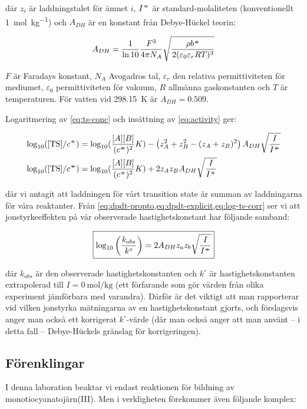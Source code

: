 där $z_i$ är laddningstalet för ämnet $i$, $I^{-\kern-5pt{\circ}\kern-5pt-}$ är
standard-molaliteten (konventionellt \SI{1}{\mole\per\kg}) och $A_{DH}$
är en konstant från Debye-Hückel teorin: 

\begin{equation}
  \label{eq:debye-huckel-a}
  A_{DH} = \frac{1}{\ln 10} \frac{F^3}{4\pi N_A}\sqrt{\frac{\rho b^{-\kern-5pt{\circ}\kern-5pt-}}{2(\varepsilon_0\varepsilon_rRT)^3}}
\end{equation}

$F$ är Faradays konstant, $N_A$ Avogadros tal, $\varepsilon_r$ den
relativa permittiviteten för mediumet, $\varepsilon_0$ permittiviteten för
vakuum, $R$ allmänna gaskonstanten och $T$ är temperaturen. För vatten vid
\SI{298.15}{\kelvin} är $A_{DH} = 0.509$.

Logaritmering av \cref{eq:ts-conc} och insättning av \cref{eq:activity}
ger:

\begin{align}
  \log_{10}([\ce{TS}] / c^\plimsoll) &= \log_{10}(\frac{[A][B]}{(c^\plimsoll)^2}K) - \left(z_A^2 + z_B^2 - (z_A+z_B)^2\right) A_{DH}
                  \sqrt{\frac{I}{I^\plimsoll}} \\
  \label{eq:log-ts-corr}
  \log_{10}([\ce{TS}] / c^\plimsoll) &= \log_{10}(\frac{[A][B]}{(c^\plimsoll)^2}K) + 2z_Az_BA_{DH}\sqrt{\frac{I}{I^\plimsoll}}
\end{align}

där vi antagit att laddningen för vårt transition state är summan av
laddningarna för våra reaktanter.
Från \cref{eq:dpdt-propto,eq:dpdt-explicit,eq:log-ts-corr} ser vi att jonstyrkeeffekten
på vår observerade hastighetskonstant har följande samband:

\begin{align}
  \label{eq:kinetic-salt}
  \boxed{
  \log_{10} \left( \frac{k_{obs}}{k^{\circ}} \right) = 2A_{DH}z_az_b\sqrt{\frac{I}{I^{-\kern-5pt{\circ}\kern-5pt-}}}
  }
\end{align}

där $k_{obs}$ är den observerade hastighetskonstanten och $k^{\circ}$ är
hastighetskonstanten extrapolerad till $I = \SI{0}{\mole\per\kg}$ (ett
förfarande som gör värden från olika experiment jämförbara med
varandra). Därför är det viktigt att man rapporterar vid vilken jonstyrka
mätningarna av en hastighetskonstant gjorts, och förslagsvis anger man
också ett korrigerat $k^\circ$-värde (där man också anger att man använt
-- i detta fall -- Debye-Hückels gränslag för korrigeringen).

\subsection{Förenklingar}
I denna laboration beaktar vi endast reaktionen för bildning av
monotiocyanatojärn(III). Men i verkligheten förekommer även följande
komplex: 

